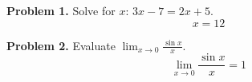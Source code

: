 \documentclass[11pt]{article}
\begin{document}
\textbf{Problem 1.} Solve for $x$: $3x - 7 = 2x + 5$.
\[
x = 12
\]

\bigskip
\textbf{Problem 2.} Evaluate $\displaystyle\lim_{x\to 0} \frac{\sin x}{x}$.
\[
\lim_{x\to 0} \frac{\sin x}{x} = 1
\]
\end{document}
